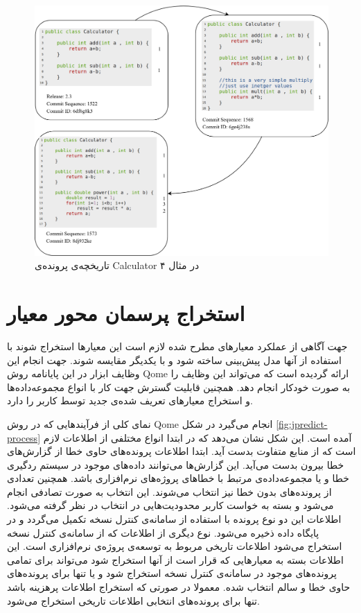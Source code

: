 \begin{figure}[H]
	\centering
	\includegraphics[width=1\textwidth]{img/method/example3.png}
	\caption{ تاریخچه‌ی پرونده‌ی Calculator در مثال ۴}
	\label{fig:example3}
\end{figure}

\section{استخراج پرسمان محور معیار}
جهت آگاهی از عملکرد معیارهای مطرح شده لازم است این معیارها استخراج شوند با استفاده از آنها مدل پیش‌بینی ساخته شود و با یکدیگر مقایسه شوند. جهت انجام این وظایف ابزار  در این پایانامه روش Qome ارائه گردیده است که می‌تواند این وظایف را به صورت خودکار انجام دهد. همچنین قابلیت گسترش جهت کار با انواع مجموعه‌داده‌ها و استخراج معیارهای تعریف شده‌ی جدید توسط کاربر را دارد. 

نمای کلی از فرآیند‌هایی که در روش Qome انجام می‌گیرد در شکل \ref{fig:jpredict-process}  آمده است. این شکل نشان می‌دهد که در ابتدا انواع مختلفی از اطلاعات لازم است که از منابع متفاوت بدست آید. ابتدا اطلاعات پرونده‌های حاوی خطا از گزارش‌های خطا بیرون بدست می‌آید. این گزارش‌ها می‌توانند داده‌های موجود در سیستم ردگیری خطا و یا  مجموعه‌داده‌ی مرتبط با خطاهای پروژه‌های نرم‌افزاری باشد. همچنین تعدادی از پرونده‌های بدون خطا نیز انتخاب می‌شوند. این انتخاب به صورت تصادفی انجام می‌شود و بسته به خواست کاربر محدودیت‌هایی در انتخاب در نظر گرفته می‌شود. اطلاعات این دو نوع پرونده با استفاده از سامانه‌ی کنترل نسخه تکمیل می‌گردد و در پایگاه داده ذخیره می‌شود. نوع دیگری از اطلاعات که از سامانه‌ی کنترل نسخه استخراج می‌شود اطلاعات تاریخی مربوط به توسعه‌ی پروژه‌ی نرم‌افزاری است. این اطلاعات بسته به معیارهایی که قرار است از آنها استخراج شود می‌تواند برای تمامی پرونده‌های موجود در سامانه‌ی کنترل نسخه استخراج شود و یا تنها برای پرونده‌های حاوی خطا و سالم انتخاب شده. معمولا در صورتی که استخراج اطلاعات پرهزینه باشد تنها برای پرونده‌های انتخابی اطلاعات تاریخی استخراج می‌شود. 

